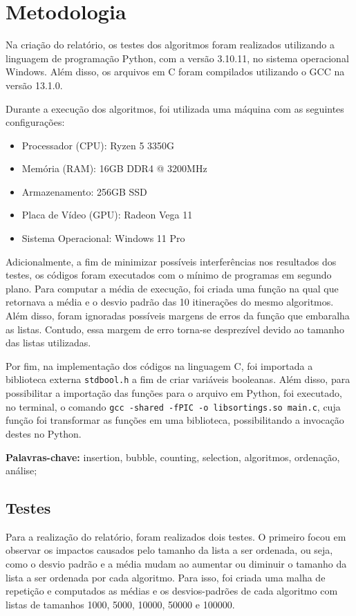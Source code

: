 \documentclass[10pt,a4paper]{article}
\newcommand{\code}[1]{\colorbox{light-gray}{\lstinline{#1}}}
\begin{document}
\section*{Metodologia}
Na criação do relatório, os testes dos algoritmos foram realizados utilizando a linguagem de programação Python, com a versão 3.10.11, no sistema operacional Windows.
Além disso, os arquivos em C foram compilados utilizando o GCC na versão 13.1.0.

Durante a execução dos algoritmos, foi utilizada uma máquina com as seguintes configurações:

\begin{itemize}
\item    Processador (CPU): Ryzen 5 3350G 
\item Memória (RAM): 16GB DDR4 @ 3200MHz
\item Armazenamento: 256GB SSD
\item Placa de Vídeo (GPU): Radeon Vega 11
\item Sistema Operacional: Windows 11 Pro
\end{itemize}
Adicionalmente, a fim de minimizar possíveis interferências nos resultados dos testes, os códigos foram executados com o mínimo de programas em segundo plano. 
Para computar a média de execução, foi criada uma função na qual que retornava a média e o desvio padrão das 10 itinerações do mesmo algoritmos.
Além disso, foram ignoradas possíveis margens de erros da função que embaralha as listas. Contudo, essa margem de erro torna-se desprezível devido ao tamanho das listas utilizadas.

Por fim, na implementação dos códigos na linguagem C, foi importada a biblioteca externa \code{stdbool.h} a fim de criar variáveis booleanas. Além disso, para possibilitar a importação das funções para o arquivo em Python, foi executado, no terminal, o comando \code{gcc -shared -fPIC -o libsortings.so main.c}, cuja função foi transformar as funções em uma biblioteca, possibilitando a invocação destes no Python.

\noindent\textbf{Palavras-chave:} insertion, bubble, counting, selection, algoritmos, ordenação, análise;

\subsection*{Testes}
    Para a realização do relatório, foram realizados dois testes. 
    O primeiro focou em observar os impactos causados pelo tamanho da lista a ser ordenada, ou seja, como o desvio padrão e a média mudam ao aumentar ou diminuir o tamanho da lista a ser ordenada por cada algoritmo. 
    Para isso, foi criada uma malha de repetição e computados as médias e os desvios-padrões de cada algoritmo com listas de tamanhos 1000, 5000, 10000, 50000 e 100000.
    
\end{document}
